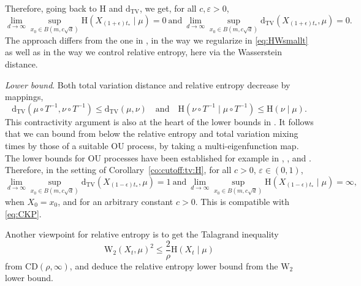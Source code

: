 \documentclass[10pt,reqno]{amsart}
\numberwithin{equation}{section}
\newcommand{\DTV}{\mathrm{d}_{\mathrm{TV}}}
\begin{document}
Therefore, going back to $\mathrm{H}$ and $\DTV$, we get, for all $c,\varepsilon>0$,
\begin{equation}
  \lim_{d\to\infty}\sup_{x_0\in B(m,c\sqrt{d})}\mathrm{H}(X_{(1+\epsilon)t_*}\mid\mu)=0 
  \ \text{and}\ %
  \lim_{d\to\infty}\sup_{x_0\in B(m,c\sqrt{d})}\DTV(X_{(1+\epsilon)t_*},\mu)=0.
\end{equation}
The approach differs from the one in \cite{BCL23}, in the way we regularize in
\eqref{eq:HWsmallt} as well as in the way we control relative entropy, here
via the Wasserstein distance.

\emph{Lower bound}. Both total variation distance and relative entropy
decrease by mappings,
\begin{equation}
  \DTV(\mu \circ T^{-1}, \nu \circ T^{-1}) \leq \DTV(\mu,\nu)
  \quad\text{and}\quad
  \mathrm{H}(\nu \circ T^{-1}\mid \mu\circ T^{-1}) \leq \mathrm{H}(\nu\mid\mu).
\end{equation}
This contractivity argument is also at the heart of the lower bounds in
\cite{BCL23}. It follows that we can bound from below the relative entropy and
total variation mixing times by those of a suitable OU process, by taking a
multi-eigenfunction map. The lower bounds for OU processes have been
established for example in \cite{MR2203823}, \cite{MR2260742}, and
\cite[Th.~1.2]{BCL23}. Therefore, in the setting of
Corollary~\ref{co:cutoff:tv:H}, for all $c>0$, $\varepsilon\in(0,1)$,
\begin{equation}
  \lim_{d\to\infty}\sup_{x_0\in B(m, c\sqrt{d})} \DTV(X_{(1-\epsilon)t_*},\mu)=1
  \ \text{and}\ \lim_{d\to\infty}\sup_{x_0\in B(m, c\sqrt{d})} \mathrm{H}(X_{(1-\epsilon)t_*}\mid\mu)=\infty,
\end{equation}
when $X_0=x_0$, and for an arbitrary constant $c>0$. This is compatible with
\eqref{eq:CKP}. 

Another viewpoint for relative entropy is to get the Talagrand inequality 
\begin{equation}
  \mathrm{W}_2(X_t, \mu)^2 \leq \frac{2}{\rho}\mathrm{H}(X_t\mid\mu)
\end{equation}
from CD$(\rho, \infty)$, and deduce the relative entropy lower bound from the $\mathrm{W}_2$ lower bound. 
\end{document}
